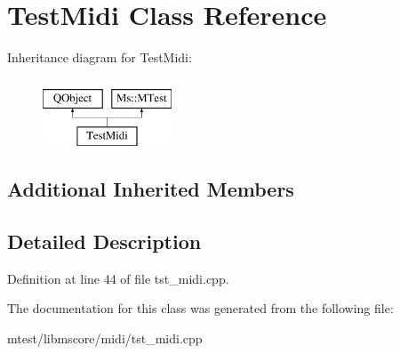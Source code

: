 \hypertarget{class_test_midi}{}\section{Test\+Midi Class Reference}
\label{class_test_midi}
Inheritance diagram for Test\+Midi\+:\begin{figure}[H]
\begin{center}
\leavevmode
\includegraphics[height=2.000000cm]{class_test_midi}
\end{center}
\end{figure}
\subsection*{Additional Inherited Members}


\subsection{Detailed Description}


Definition at line 44 of file tst\+\_\+midi.\+cpp.



The documentation for this class was generated from the following file\+:\begin{DoxyCompactItemize}
\item 
mtest/libmscore/midi/tst\+\_\+midi.\+cpp\end{DoxyCompactItemize}
